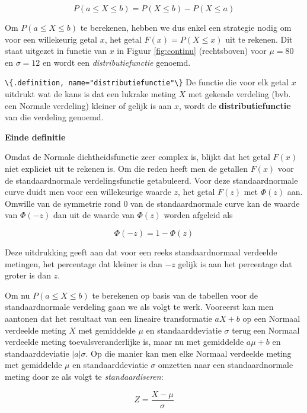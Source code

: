 \documentclass[
  12pt,dutch,coursenotes]{book}
\newcommand{\passthrough}[1]{#1}
\begin{document}
\begin{equation*}
P(a\leq X\leq b)=P(X\leq b)-P(X\leq a)
\end{equation*}

Om \(P(a\leq X\leq b)\) te berekenen, hebben we dus enkel een strategie nodig
om voor een willekeurig getal \(x\), het getal \(F(x) = P(X \leq x)\) uit te
rekenen. Dit staat uitgezet in functie van \(x\) in Figuur \ref{fig:continu}
(rechtsboven) voor \(\mu=80\) en \(\sigma=12\) en wordt een \emph{distributiefunctie} genoemd.

\passthrough{\lstinline!\{.definition, name="distributiefunctie"\}!}
De functie die voor elk getal \(x\) uitdrukt wat de kans is dat een lukrake
meting \(X\) met gekende verdeling (bvb. een Normale verdeling) kleiner of
gelijk is aan \(x\), wordt de \textbf{distributiefunctie} van die verdeling
genoemd.

\textbf{Einde definitie}

Omdat de Normale dichtheidsfunctie zeer complex is, blijkt dat het getal \(F(x)\) niet expliciet uit te rekenen is. Om die reden heeft men de getallen \(F(x)\)
voor de standaardnormale verdelingsfunctie getabuleerd. Voor
deze standaardnormale curve duidt men voor een willekeurige waarde \(z\), het
getal \(F(z)\) met \(\Phi(z)\) aan. Omwille van de symmetrie rond 0 van de
standaardnormale curve kan de waarde van \(\Phi(-z)\) dan uit de waarde van \(\Phi(z)\) worden afgeleid als

\begin{equation*}
\Phi(-z)= 1- \Phi(z)
\end{equation*}

Deze uitdrukking geeft aan dat voor een reeks standaardnormaal verdeelde
metingen, het percentage dat kleiner is dan \(-z\) gelijk is aan
het percentage dat groter is dan \(z\).

Om nu \(P(a\leq X\leq b)\) te berekenen op basis van de tabellen voor de
standaardnormale verdeling gaan we als volgt te werk. Vooreerst kan men
aantonen dat het resultaat van een lineaire transformatie \(aX+b\) op een
Normaal verdeelde meting \(X\) met gemiddelde \(\mu\) en standaarddeviatie \(\sigma\) terug een Normaal verdeelde meting toevalsveranderlijke is, maar nu
met gemiddelde \(a\mu+b\) en standaarddeviatie \(|a|\sigma\). Op die manier kan
men elke Normaal verdeelde meting met gemiddelde \(\mu\) en standaarddeviatie \(\sigma\) omzetten naar een standaardnormale meting door ze als volgt te
\emph{standaardiseren}:

\begin{equation*}
Z = \frac{X- \mu}{\sigma}
\end{equation*}
\end{document}
